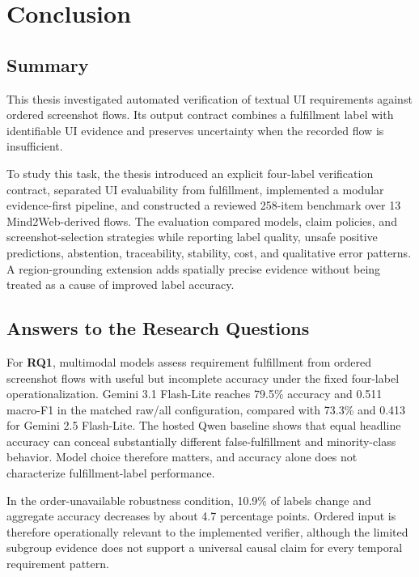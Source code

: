 \chapter{Conclusion}\label{conclusion}

\section{Summary}\label{summary}

This thesis investigated automated verification of textual UI requirements
against ordered screenshot flows. Its output contract combines a fulfillment
label with identifiable UI evidence and preserves uncertainty when the recorded
flow is insufficient.

To study this task, the thesis introduced an explicit four-label verification
contract, separated UI evaluability from fulfillment, implemented a modular
evidence-first pipeline, and constructed a reviewed 258-item benchmark over 13
Mind2Web-derived flows. The evaluation compared models, claim policies, and
screenshot-selection strategies while reporting label quality, unsafe positive
predictions, abstention, traceability, stability, cost, and qualitative error
patterns. A region-grounding extension adds spatially precise evidence without
being treated as a cause of improved label accuracy.

\section{Answers to the Research Questions}\label{answers-to-the-research-questions}

For \textbf{RQ1}, multimodal models assess requirement fulfillment from ordered
screenshot flows with useful but incomplete accuracy under the fixed
four-label operationalization. Gemini 3.1 Flash-Lite reaches 79.5\% accuracy and
0.511 macro-F1 in the matched raw/all configuration, compared with 73.3\% and
0.413 for Gemini 2.5 Flash-Lite. The hosted Qwen baseline shows that equal
headline accuracy can conceal substantially different false-fulfillment and
minority-class behavior. Model choice therefore matters, and accuracy alone
does not characterize fulfillment-label performance.

In the order-unavailable robustness condition, 10.9\% of labels change and aggregate accuracy decreases
by about 4.7 percentage points. Ordered input is therefore operationally
relevant to the implemented verifier, although the limited subgroup evidence
does not support a universal causal claim for every temporal requirement
pattern.

